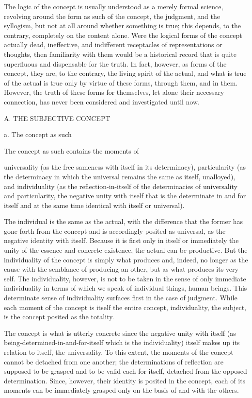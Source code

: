 The logic of the concept is
usually understood as a merely formal science,
revolving around the form as such of
the concept, the judgment, and the syllogism,
but not at all around whether something is true;
this depends, to the contrary, completely on the content alone.
Were the logical forms of the concept actually dead, ineffective,
and indifferent receptacles of representations or thoughts,
then familiarity with them would be a historical record that
is quite superfluous and dispensable for the truth.
In fact, however, as forms of the concept,
they are, to the contrary,
the living spirit of the actual,
and what is true of the actual is true
only by virtue of these forms, through them, and in them.
However, the truth of these forms for themselves,
let alone their necessary connection,
has never been considered and investigated until now.

A. THE SUBJECTIVE CONCEPT

a. The concept as such

The concept as such contains the moments of

universality
(as the free sameness with itself in its determinacy),
particularity
(as the determinacy in which
the universal remains the same as itself, unalloyed),
and individuality
(as the reflection-in-itself of
the determinacies of universality and particularity,
the negative unity with itself
that is the determinate in and for itself
and at the same time identical with itself or universal).

The individual is the same as the actual,
with the difference that the former has
gone forth from the concept
and is accordingly posited as universal,
as the negative identity with itself.
Because it is first only in itself
or immediately the unity of
the essence and concrete existence,
the actual can be productive.
But the individuality of the concept is
simply what produces and, indeed,
no longer as the cause with
the semblance of producing an other,
but as what produces its very self.
The individuality, however, is
not to be taken in the sense of
only immediate individuality in terms of which
we speak of individual things, human beings.
This determinate sense of individuality
surfaces first in the case of judgment.
While each moment of the concept is
itself the entire concept,
individuality, the subject, is
the concept posited as the totality.

The concept is what is utterly concrete
since the negative unity with itself
(as being-determined-in-and-for-itself
which is the individuality)
itself makes up its relation to itself, the universality.
To this extent, the moments of the concept
cannot be detached from one another;
the determinations of reflection are supposed
to be grasped and to be valid each for itself,
detached from the opposed determination.
Since, however, their identity is posited in the concept,
each of its moments can be immediately grasped only
on the basis of and with the others.


